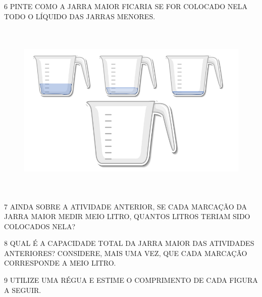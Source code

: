 \pagebreak
\num{6} PINTE COMO A JARRA MAIOR FICARIA SE FOR COLOCADO NELA TODO O LÍQUIDO DAS
JARRAS MENORES.


\begin{figure}[htpb!]
\centering
\includegraphics[width=5.90556in,height=3.37222in]{media/image28.png}
\end{figure}


\num{7} AINDA SOBRE A ATIVIDADE ANTERIOR, SE CADA MARCAÇÃO DA JARRA MAIOR MEDIR MEIO LITRO,
QUANTOS LITROS TERIAM SIDO COLOCADOS NELA?



\num{8} QUAL É A CAPACIDADE TOTAL DA JARRA MAIOR DAS ATIVIDADES ANTERIORES? CONSIDERE, MAIS UMA VEZ, QUE CADA MARCAÇÃO CORRESPONDE A MEIO LITRO.


\pagebreak
\num{9} UTILIZE UMA RÉGUA E ESTIME O COMPRIMENTO DE CADA FIGURA A SEGUIR.

